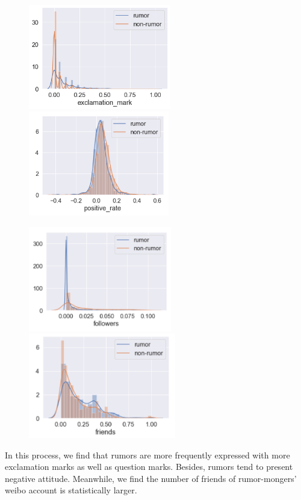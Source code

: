 \documentclass[12pt,a4paper]{article}
\begin{document}
\begin{figure}[htbp]
	\centering
	\begin{minipage}{0.32\linewidth}
		\includegraphics[height=1.8in]{pic/exclamation_mark}
	\end{minipage}
	\hfil
	\begin{minipage}{0.32\linewidth}
		\includegraphics[height=1.8in]{pic/positive_rate}
	\end{minipage}
\end{figure}

\begin{figure}[htbp]
	\centering
	\begin{minipage}{0.32\linewidth}
		\includegraphics[height=1.8in]{pic/followers}
	\end{minipage}
	\hfil
	\begin{minipage}{0.32\linewidth}
		\includegraphics[height=1.8in]{pic/friends}
	\end{minipage}
\end{figure}
\clearpage
In this process, we find that rumors are more frequently expressed with more exclamation marks as well as question marks.\label{2.1marks} Besides, rumors tend to present negative attitude. Meanwhile, we find the number of friends of rumor-mongers' weibo account is statistically larger.
\end{document}
